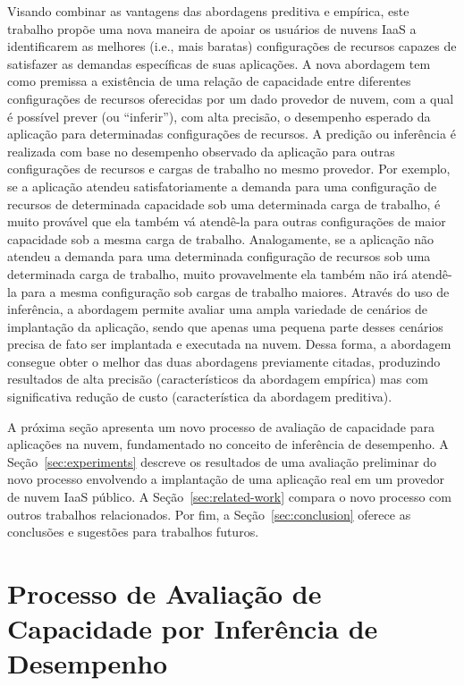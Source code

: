 \documentclass[12pt]{article}
\begin{document}
Visando combinar as vantagens das abordagens preditiva e empírica, este trabalho propõe uma nova maneira de apoiar os usuários de nuvens IaaS a identificarem as melhores (i.e., mais baratas) configurações de recursos capazes de satisfazer as demandas específicas de suas aplicações. A nova abordagem tem como premissa a existência de uma relação de capacidade entre diferentes configurações de recursos oferecidas por um dado provedor de nuvem, 
com a qual é possível prever (ou ``inferir''), com alta precisão, o desempenho esperado da aplicação para determinadas configurações de recursos. A predição ou inferência é realizada com base no desempenho observado da aplicação para outras configurações de recursos e cargas de trabalho no mesmo provedor. Por exemplo, se a aplicação atendeu satisfatoriamente a demanda para uma configuração de recursos de determinada capacidade sob uma determinada carga de trabalho, é muito provável que ela também vá atendê-la para outras configurações de maior capacidade sob a mesma carga de trabalho. Analogamente, se a aplicação não atendeu a demanda para uma determinada configuração de recursos sob uma determinada carga de trabalho, muito provavelmente ela também não irá atendê-la para a mesma configuração sob cargas de trabalho maiores. Através do uso de inferência, a abordagem permite avaliar uma ampla variedade de cenários de implantação da aplicação, sendo que apenas uma pequena parte desses cenários precisa de fato ser implantada e executada na nuvem. Dessa forma, a abordagem consegue obter o melhor das duas abordagens previamente citadas, produzindo resultados de alta precisão (característicos da abordagem empírica) mas com significativa redução de custo (característica da abordagem preditiva).

A próxima seção apresenta um novo processo de avaliação de capacidade para aplicações na nuvem, fundamentado no conceito de inferência de desempenho. A Seção~\ref{sec:experiments} descreve os resultados de uma avaliação preliminar do novo processo envolvendo a implantação de uma aplicação real em um provedor de nuvem IaaS público. A Seção~\ref{sec:related-work} compara o novo processo com outros trabalhos relacionados. Por fim, a Seção~\ref{sec:conclusion} oferece as conclusões e sugestões para trabalhos futuros.


\section{Processo de Avaliação de Capacidade por Inferência de Desempenho}\label{sec:process}
\end{document}
